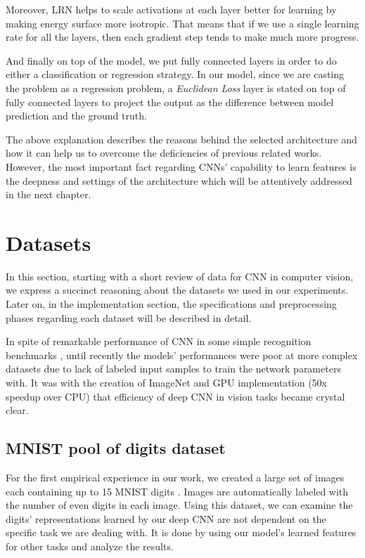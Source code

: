 \indent Moreover, LRN helps to scale activations at each layer better for learning by making energy surface more isotropic. That means that if we use a single learning rate for all the layers, then each gradient step tends to make much more progress\cite{jarrett2009best}. 

And finally on top of the model, we put fully connected layers in order to do either a classification or regression strategy. In our model, since we are casting the problem as a regression problem, a \textit{Euclidean Loss} layer is stated on top of fully connected layers to project the output as the difference between model prediction and the ground truth. 

The above explanation describes the reasons behind the selected architecture and how it can help us to overcome the deficiencies of previous related works. However, the most important fact regarding CNNs' capability to learn features is the deepness and settings of the architecture which will be attentively addressed in the next chapter.  

\section{Datasets} 

In this section, starting with a short review of data for CNN in computer vision, we express a succinct reasoning about the datasets we used in our experiments. Later on, in the implementation section, the specifications and preprocessing phases regarding each dataset will be described in detail. 

In spite of remarkable  performance of CNN in some simple recognition benchmarks \cite{cirecsan2011convolutional, ciresan2015multi, wan2013regularization, cirecsan2012multi}, until recently the models' performances were poor at more complex datasets \cite{griffin2007caltech} due to lack of labeled input samples to train the network parameters with. It was with the creation of ImageNet\cite{deng2009imagenet} and GPU implementation\cite{krizhevsky2012imagenet} (50x speedup over CPU) that efficiency of deep CNN in vision tasks became crystal clear.

\subsection{MNIST pool of digits dataset}

For the first empirical experience in our work, we created a large set of images each containing up to 15 MNIST digits . Images are automatically labeled with the number of even digits in each image. Using this dataset, we can examine the digits' representations learned by our deep CNN are not dependent on the specific task we are dealing with. It is done by using our model's learned features for other tasks and analyze the results. 

